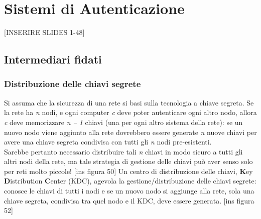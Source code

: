 \chapter{Sistemi di Autenticazione}

[INSERIRE SLIDES 1-48]

\section{Intermediari fidati}

\subsection{Distribuzione delle chiavi segrete}
Si assuma che la sicurezza di una rete si basi sulla tecnologia a chiave segreta. Se la rete ha \textit{n} nodi, e
ogni computer \textit{c} deve poter autenticare ogni altro nodo, allora \textit{c} deve memorizzare \textit{n – 1} chiavi (una per ogni altro sistema della rete): se un nuovo nodo viene aggiunto alla rete dovrebbero essere generate \textit{n} nuove chiavi per avere una chiave segreta condivisa con tutti gli \textit{n} nodi pre-esistenti. \\
Sarebbe pertanto necessario distribuire tali \textit{n} chiavi in modo sicuro a tutti gli altri nodi della rete, ma tale strategia di gestione delle chiavi può aver senso solo per reti molto piccole!
[ins figura 50]
Un centro di distribuzione delle chiavi, \textbf{K}ey \textbf{D}istribution \textbf{C}enter (KDC), agevola la gestione/distribuzione delle chiavi segrete: conosce le chiavi di tutti i nodi e se un nuovo nodo si aggiunge alla rete, sola una chiave segreta, condivisa tra quel nodo e il KDC, deve essere generata.
[ins figura 52]

